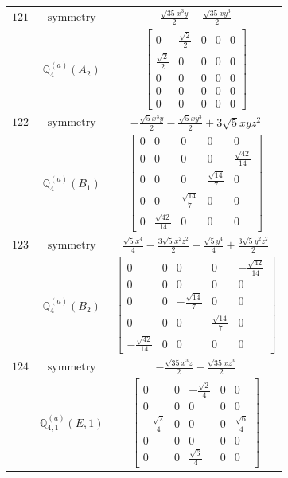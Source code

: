 \documentclass[fleqn,8pt,landscape]{jsarticle}
\begin{document}
\begin{longtable}{ccc}
$ 121 $ & $ \text{symmetry} $ & $ \frac{\sqrt{35} x^{3} y}{2} - \frac{\sqrt{35} x y^{3}}{2} $ \\
$  $ & $ \mathbb{Q}_{4}^{(a)}(A_{2}) $ & $ \begin{bmatrix} 0 & \frac{\sqrt{2}}{2} & 0 & 0 & 0 \\ \frac{\sqrt{2}}{2} & 0 & 0 & 0 & 0 \\ 0 & 0 & 0 & 0 & 0 \\ 0 & 0 & 0 & 0 & 0 \\ 0 & 0 & 0 & 0 & 0 \end{bmatrix} $ \\ \hline
$ 122 $ & $ \text{symmetry} $ & $ - \frac{\sqrt{5} x^{3} y}{2} - \frac{\sqrt{5} x y^{3}}{2} + 3 \sqrt{5} x y z^{2} $ \\
$  $ & $ \mathbb{Q}_{4}^{(a)}(B_{1}) $ & $ \begin{bmatrix} 0 & 0 & 0 & 0 & 0 \\ 0 & 0 & 0 & 0 & \frac{\sqrt{42}}{14} \\ 0 & 0 & 0 & \frac{\sqrt{14}}{7} & 0 \\ 0 & 0 & \frac{\sqrt{14}}{7} & 0 & 0 \\ 0 & \frac{\sqrt{42}}{14} & 0 & 0 & 0 \end{bmatrix} $ \\ \hline
$ 123 $ & $ \text{symmetry} $ & $ \frac{\sqrt{5} x^{4}}{4} - \frac{3 \sqrt{5} x^{2} z^{2}}{2} - \frac{\sqrt{5} y^{4}}{4} + \frac{3 \sqrt{5} y^{2} z^{2}}{2} $ \\
$  $ & $ \mathbb{Q}_{4}^{(a)}(B_{2}) $ & $ \begin{bmatrix} 0 & 0 & 0 & 0 & - \frac{\sqrt{42}}{14} \\ 0 & 0 & 0 & 0 & 0 \\ 0 & 0 & - \frac{\sqrt{14}}{7} & 0 & 0 \\ 0 & 0 & 0 & \frac{\sqrt{14}}{7} & 0 \\ - \frac{\sqrt{42}}{14} & 0 & 0 & 0 & 0 \end{bmatrix} $ \\ \hline
$ 124 $ & $ \text{symmetry} $ & $ - \frac{\sqrt{35} x^{3} z}{2} + \frac{\sqrt{35} x z^{3}}{2} $ \\
$  $ & $ \mathbb{Q}_{4,1}^{(a)}(E,1) $ & $ \begin{bmatrix} 0 & 0 & - \frac{\sqrt{2}}{4} & 0 & 0 \\ 0 & 0 & 0 & 0 & 0 \\ - \frac{\sqrt{2}}{4} & 0 & 0 & 0 & \frac{\sqrt{6}}{4} \\ 0 & 0 & 0 & 0 & 0 \\ 0 & 0 & \frac{\sqrt{6}}{4} & 0 & 0 \end{bmatrix} $ \\ \hline

\end{longtable}
\end{document}
